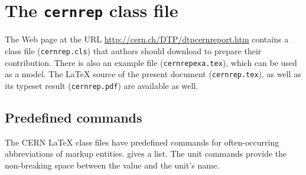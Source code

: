 \documentclass{cernrep}
\begin{document}
\newpage
\appendix

\section{The \texttt{cernrep} class file}

The Web page at the URL \url{http://cern.ch/DTP/dtpcernreport.htm}
contains a class file (\texttt{cernrep.cls}) that authors should
download to prepare their contribution. There is also an example file
(\texttt{cernrepexa.tex}), which can be used as a model. The \LaTeX{}
source of the present document (\texttt{cernrep.tex}), as well as its
typeset result (\texttt{cernrep.pdf}) are available as well.

\subsection{Predefined commands}

The CERN \LaTeX{} class files have predefined commands for
often-occurring abbreviations of markup entities. 
gives a list. The unit commands provide the non-breaking space between
the value and the unit's name.
\end{document}
